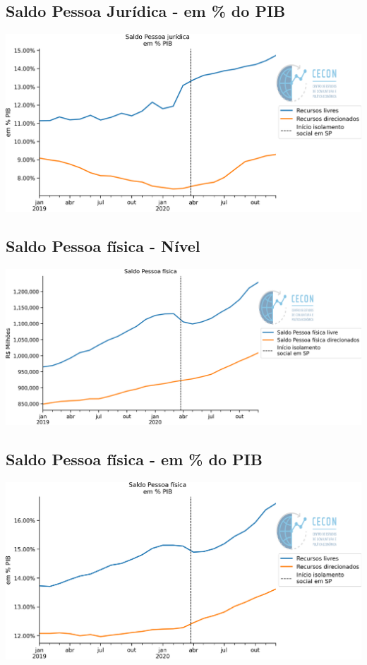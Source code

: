 \documentclass{SelfArx}
\begin{document}
\subsection*{Saldo Pessoa Jurídica - em \% do PIB}
\label{sec:orge5e21be}
\begin{center}
\includegraphics[width=.9\linewidth]{./figs/Credito/SaldoPJ_PIB.png}
\end{center}

\subsection*{Saldo Pessoa física - Nível}
\label{sec:orgf013576}

\begin{center}
\includegraphics[width=.9\linewidth]{./figs/Credito/SaldoPF.png}
\end{center}


\subsection*{Saldo Pessoa física - em \% do PIB}
\label{sec:org71fabaa}

\begin{center}
\includegraphics[width=.9\linewidth]{./figs/Credito/SaldoPF_PIB.png}
\end{center}
\end{document}
